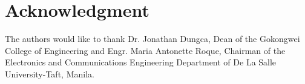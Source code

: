 \chapter*{Acknowledgment}

The authors would like to thank Dr. Jonathan Dungca, Dean of the Gokongwei College of Engineering and Engr. Maria Antonette Roque, Chairman of the Electronics and Communications Engineering Department of De La Salle University-Taft, Manila.